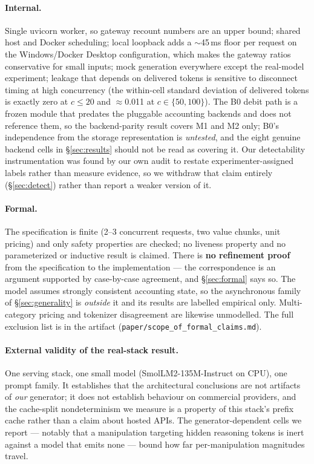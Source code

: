 \documentclass[11pt]{article}
\begin{document}
\paragraph{Internal.} Single uvicorn worker, so gateway recount numbers are an upper
bound; shared host and Docker scheduling; local loopback adds a $\sim$45\,ms floor per
request on the Windows/Docker Desktop configuration, which makes the gateway ratios
conservative for small inputs; mock generation everywhere except the real-model
experiment; leakage that depends on delivered tokens is sensitive to disconnect timing at
high concurrency (the within-cell standard deviation of delivered tokens is exactly zero
at $c\le20$ and $\approx$0.011 at $c\in\{50,100\}$). The B0 debit path is a frozen
module that predates the pluggable accounting backends and does not reference them, so
the backend-parity result covers M1 and M2 only; B0's independence from the storage
representation is \emph{untested}, and the eight genuine backend cells in
\S\ref{sec:results} should not be read as covering it. Our detectability instrumentation
was found by our own audit to restate experimenter-assigned labels rather than measure
evidence, so we withdraw that claim entirely (\S\ref{sec:detect}) rather than report a
weaker version of it.

\paragraph{Formal.} The specification is finite (2--3 concurrent requests, two value
chunks, unit pricing) and only safety properties are checked; no liveness property and no
parameterized or inductive result is claimed. There is \textbf{no refinement proof} from
the specification to the implementation --- the correspondence is an argument supported by
case-by-case agreement, and \S\ref{sec:formal} says so. The model assumes strongly
consistent accounting state, so the asynchronous family of \S\ref{sec:generality} is
\emph{outside} it and its results are labelled empirical only. Multi-category pricing and
tokenizer disagreement are likewise unmodelled. The full exclusion list is in the artifact
(\texttt{paper/scope\_of\_formal\_claims.md}).

\paragraph{External validity of the real-stack result.} One serving stack, one small model
(SmolLM2-135M-Instruct on CPU), one prompt family. It establishes that the architectural
conclusions are not artifacts of \emph{our} generator; it does not establish behaviour on
commercial providers, and the cache-split nondeterminism we measure is a property of this
stack's prefix cache rather than a claim about hosted APIs. The generator-dependent cells
we report --- notably that a manipulation targeting hidden reasoning tokens is inert
against a model that emits none --- bound how far per-manipulation magnitudes travel.
\end{document}
